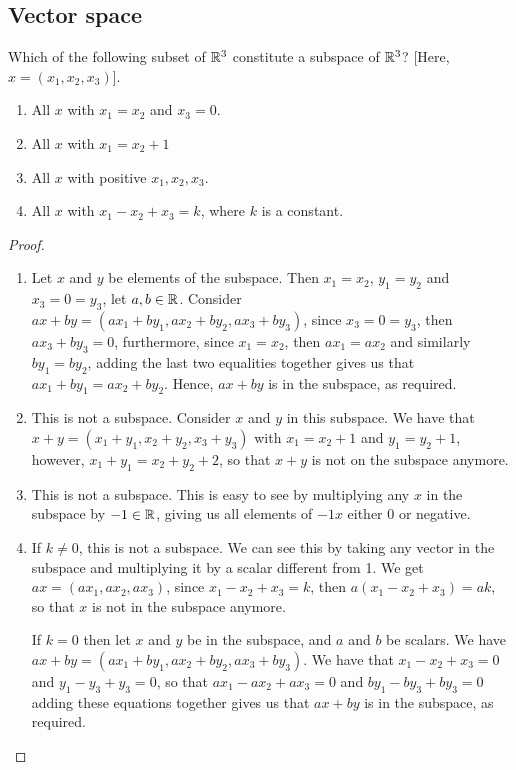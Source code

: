 \subsection{Vector space}


\begin{exercise}{4}
Which of the following subset of $\mathbb{R}^3$ constitute a subspace of $\mathbb{R}^3$? [Here, $x=(x_1,x_2,x_3)$].
\begin{enumerate}
    \item All $x$ with $x_1=x_2$ and $x_3=0$.
    \item All $x$ with $x_1=x_2+1$
    \item All $x$ with positive $x_1,x_2,x_3$.
    \item All $x$ with $x_1-x_2+x_3=k$, where $k$ is a constant.
\end{enumerate}
\end{exercise}
\begin{proof}
\begin{enumerate}
    \item Let $x$ and $y$ be elements of the subspace. Then $x_1=x_2$, $y_1=y_2$ and $x_3=0=y_3$, let $a,b\in\mathbb{R}$. Consider $ax+by=(ax_1+by_1,ax_2+by_2,ax_3+by_3)$, since $x_3=0=y_3$, then $ax_3+by_3=0$, furthermore, since $x_1=x_2$, then $ax_1=ax_2$ and similarly $by_1=by_2$, adding the last two equalities together gives us that $ax_1+by_1=ax_2+by_2$. Hence, $ax+by$ is in the subspace, as required.
    \item This is not a subspace. Consider $x$ and $y$ in this subspace. We have that $x+y=(x_1+y_1,x_2+y_2,x_3+y_3)$ with $x_1=x_2+1$ and $y_1=y_2+1$, however, $x_1+y_1=x_2+y_2+2$, so that $x+y$ is not on the subspace anymore.
    \item This is not a subspace. This is easy to see by multiplying any $x$ in the subspace by $-1\in\mathbb{R}$, giving us all elements of $-1x$ either 0 or negative.
    \item If $k\neq 0$, this is not a subspace. We can see this by taking any vector in the subspace and multiplying it by a scalar different from 1. We get $ax=(ax_1,ax_2,ax_3)$, since $x_1-x_2+x_3=k$, then $a(x_1-x_2+x_3)=ak$, so that $x$ is not in the subspace anymore.

    If $k=0$ then let $x$ and $y$ be in the subspace, and $a$ and $b$ be scalars. We have $ax+by=(ax_1+by_1,ax_2+by_2,ax_3+by_3)$. We have that $x_1-x_2+x_3=0$ and $y_1-y_3+y_3=0$, so that $ax_1-ax_2+ax_3=0$ and $by_1-by_3+by_3=0$ adding these equations together gives us that $ax+by$ is in the subspace, as required.
\end{enumerate}
\end{proof}

